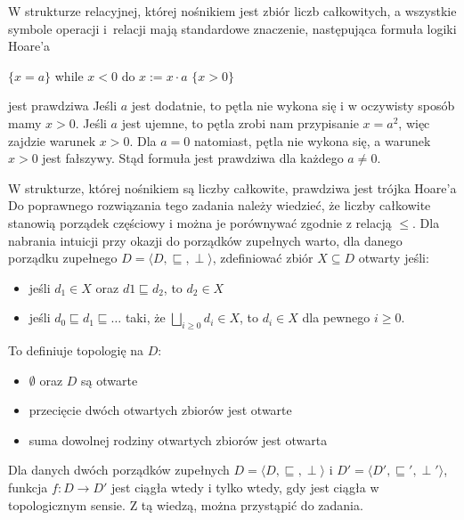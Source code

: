 \begin{solutions}
    \sol W strukturze relacyjnej, której nośnikiem jest zbiór liczb całkowitych, a wszystkie symbole operacji i~relacji mają standardowe znaczenie, następująca formuła logiki Hoare'a
    \begin{center}
        $\{x = a\}$ while $x < 0$ do $x := x \cdot a$ $\{x > 0\}$
    \end{center}
    jest prawdziwa
    Jeśli $a$ jest dodatnie, to pętla nie wykona się i w oczywisty sposób mamy $x>0$. Jeśli $a$ jest ujemne, to pętla zrobi nam przypisanie $x=a^2$, więc zajdzie warunek $x>0$. Dla $a=0$ natomiast, pętla nie wykona się, a warunek $x>0$ jest fałszywy. Stąd formuła jest prawdziwa dla każdego $a\neq0$.

    \sol W strukturze, której nośnikiem są liczby całkowite, prawdziwa jest trójka Hoare’a
    Do poprawnego rozwiązania tego zadania należy wiedzieć, że liczby całkowite stanowią porządek częściowy i można je porównywać zgodnie z relacją $\le$. Dla nabrania intuicji przy okazji do porządków zupełnych warto, dla danego porządku zupełnego $D=\langle D, \sqsubseteq ,\perp \rangle$, zdefiniować zbiór $X\subseteq D$ otwarty jeśli: \begin{itemize}
        \item jeśli $d_1\in X$ oraz $d1 \sqsubseteq d_2$, to $d_2 \in X$
        \item jeśli $d_0 \sqsubseteq d_1 \sqsubseteq \dots $ taki, że $\bigsqcup_{i\ge 0}d_i\in X$, to $d_i\in X$ dla pewnego $i\ge 0$.
    \end{itemize} 
    To definiuje topologię na $D$:
    \begin{itemize}
        \item $\emptyset$ oraz $D$ są otwarte
        \item przecięcie dwóch otwartych zbiorów jest otwarte
        \item suma dowolnej rodziny otwartych zbiorów jest otwarta
    \end{itemize}
    Dla danych dwóch porządków zupełnych $D=\langle D, \sqsubseteq ,\perp \rangle$ i $D'=\langle D', \sqsubseteq' ,\perp' \rangle$, funkcja $f:D\to D'$ jest ciągła wtedy i tylko wtedy, gdy jest ciągła w topologicznym sensie. Z tą wiedzą, można przystąpić do zadania. 


\end{solutions}
